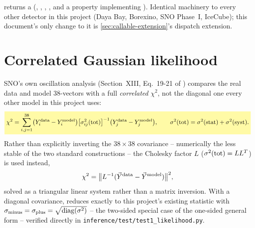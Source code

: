\begin{implbox}
 returns a
 (, ,
, , and a  property
implementing ). Identical machinery to
every other detector in this project (Daya Bay, Borexino, SNO Phase~I,
IceCube); this document's only change to it is
\cref{sec:callable-extension}'s  dispatch extension.
\end{implbox}

\section{Correlated Gaussian likelihood}
\label{sec:correlated-likelihood}


\begin{theorybox}
SNO's own oscillation analysis (Section~XIII, Eq.~19-21 of
\cite{Aharmim2005SaltPhase}) compares the real data and model 38-vectors
with a full \emph{correlated} $\chi^2$, not the diagonal one every other
model in this project uses:
\begin{equation}
  \keyresult{\chi^2 = \sum_{i,j=1}^{38}\bigl(Y_i^{\rm data}-Y_i^{\rm model}\bigr)
    \bigl[\sigma_{ij}^2({\rm tot})\bigr]^{-1}\bigl(Y_j^{\rm data}-Y_j^{\rm model}\bigr),
    \qquad \sigma^2({\rm tot}) = \sigma^2({\rm stat}) + \sigma^2({\rm syst}).}
  \label{eq:correlated-chi2}
\end{equation}
Rather than explicitly inverting the $38\times38$ covariance -- numerically
the less stable of the two standard constructions -- the Cholesky factor
$L$ ($\sigma^2({\rm tot})=LL^T$) is used instead,
\begin{equation}
  \chi^2 = \bigl\|L^{-1}(\vec Y^{\rm data}-\vec Y^{\rm model})\bigr\|^2,
  \label{eq:cholesky-chi2}
\end{equation}
solved as a triangular linear system rather than a matrix inversion. With a
diagonal covariance,  reduces exactly to this
project's existing  statistic with
$\sigma_{\rm minus}=\sigma_{\rm plus}=\sqrt{{\rm diag}(\sigma^2)}$ -- the
two-sided special case of the one-sided general form -- verified directly
in \texttt{inference/test/test1\_likelihood.py}.
\end{theorybox}

